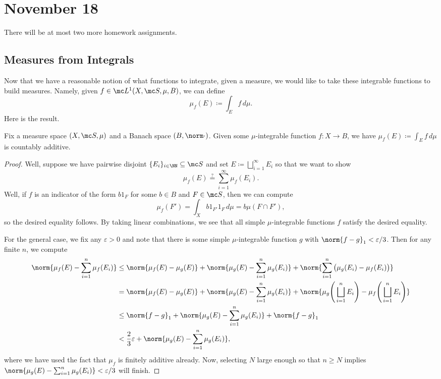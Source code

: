 \documentclass[../notes.tex]{subfiles}
\begin{document}
\section{November 18}

There will be at most two more homework assignments.

\subsection{Measures from Integrals}
Now that we have a reasonable notion of what functions to integrate, given a measure, we would like to take these integrable functions to build measures. Namely, given $f\in\mc L^1(X,\mc S,\mu,B)$, we can define
\[\mu_f(E)\coloneqq\int_Ef\,d\mu.\]
Here is the result.
\begin{proposition}
	Fix a measure space $(X,\mc S,\mu)$ and a Banach space $(B,\norm\cdot)$. Given some $\mu$-integrable function $f\colon X\to B$, we have $\mu_f(E)\coloneqq\int_Ef\,d\mu$ is countably additive.
\end{proposition}
\begin{proof}
	Well, suppose we have pairwise disjoint $\{E_i\}_{i\in\NN}\subseteq\mc S$ and set $E\coloneqq\bigsqcup_{i=1}^\infty E_i$ so that we want to show
	\[\mu_f(E)\stackrel?=\sum_{i=1}^\infty\mu_f(E_i).\]
	Well, if $f$ is an indicator of the form $b1_F$ for some $b\in B$ and $F\in\mc S$, then we can compute
	\[\mu_f(F')=\int_Xb1_{F'}1_F\,d\mu=b\mu(F\cap F'),\]
	so the desired equality follows. By taking linear combinations, we see that all simple $\mu$-integrable functions $f$ satisfy the desired equality.

	For the general case, we fix any $\varepsilon>0$ and note that there is some simple $\mu$-integrable function $g$ with $\norm{f-g}_1<\varepsilon/3$. Then for any finite $n$, we compute
	\begin{align*}
		\norm{\mu_f(E)-\sum_{i=1}^n\mu_f(E_i)} &\le \norm{\mu_f(E)-\mu_g(E)} + \norm{\mu_g(E)-\sum_{i=1}^n\mu_g(E_i)}+\norm{\sum_{i=1}^n\big(\mu_g(E_i)-\mu_f(E_i)\big)} \\
		&= \norm{\mu_f(E)-\mu_g(E)}+\norm{\mu_g(E)-\sum_{i=1}^n\mu_g(E_i)}+\norm{\mu_g\Bigg(\bigsqcup_{i=1}^nE_i\Bigg)-\mu_f\Bigg(\bigsqcup_{i=1}^nE_i\Bigg)} \\
		&\le \norm{f-g}_1+\norm{\mu_g(E)-\sum_{i=1}^n\mu_g(E_i)}+\norm{f-g}_1 \\
		&< \frac23\varepsilon+\norm{\mu_g(E)-\sum_{i=1}^n\mu_g(E_i)},
	\end{align*}
	where we have used the fact that $\mu_f$ is finitely additive already. Now, selecting $N$ large enough so that $n\ge N$ implies $\norm{\mu_g(E)-\sum_{i=1}^n\mu_g(E_i)}<\varepsilon/3$ will finish.
\end{proof}
\end{document}
